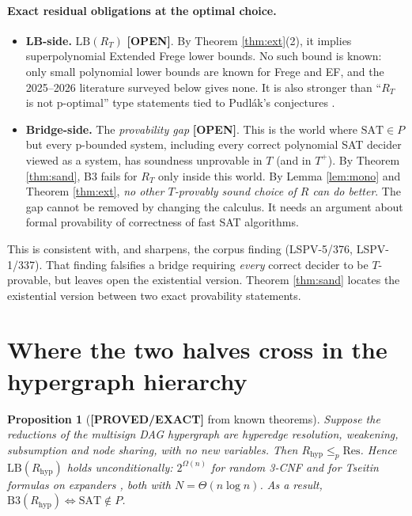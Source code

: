 \documentclass[11pt]{article}
\newtheorem{proposition}[theorem]{Proposition}
\theoremstyle{definition}
\theoremstyle{remark}
\newcommand{\SAT}{\mathrm{SAT}}
\newcommand{\status}[1]{\textbf{[#1]}}
\begin{document}
\paragraph{Exact residual obligations at the optimal choice.}
\begin{itemize}
\item \textbf{LB-side.} $\mathrm{LB}(R_T)$ \status{OPEN}. By Theorem \ref{thm:ext}(2), it implies
superpolynomial Extended Frege lower bounds. No such bound is known: only small polynomial
lower bounds are known for Frege and EF, and the 2025--2026 literature surveyed below gives
none. It is also stronger than ``$R_T$ is not p-optimal'' type statements tied to Pudlák's
conjectures \cite{Pud17}.
\item \textbf{Bridge-side.} The \emph{provability gap} \status{OPEN}. This is the world where
$\SAT\in P$ but every p-bounded system, including every correct polynomial SAT decider viewed as a
system, has soundness unprovable in $T$ (and in $T^{+}$). By Theorem \ref{thm:sand}, B3 fails for
$R_T$ only inside this world. By Lemma \ref{lem:mono} and Theorem \ref{thm:ext}, \emph{no other
$T$-provably sound choice of $R$ can do better}. The gap cannot be removed by changing the
calculus. It needs an argument about formal provability of correctness of fast SAT algorithms.
\end{itemize}

This is consistent with, and sharpens, the corpus finding (LSPV-5/376, LSPV-1/337). That finding
falsifies a bridge requiring \emph{every} correct decider to be $T$-provable, but leaves open the
existential version. Theorem \ref{thm:sand} locates the existential version between two exact
provability statements.

\section{Where the two halves cross in the hypergraph hierarchy}

\begin{proposition}[\status{PROVED/EXACT} from known theorems]\label{prop:cross}
Suppose the reductions of the multisign DAG hypergraph are hyperedge resolution, weakening,
subsumption and node sharing, with no new variables. Then $R_{\mathrm{hyp}}\le_p\mathrm{Res}$.
Hence $\mathrm{LB}(R_{\mathrm{hyp}})$ holds unconditionally: $2^{\Omega(n)}$ for random 3-CNF
\cite{CS88} and for Tseitin formulas on expanders \cite{Urq87}, both with $N=\Theta(n\log n)$. As a
result, $\mathrm{B3}(R_{\mathrm{hyp}})\Leftrightarrow\SAT\notin P$.
\end{proposition}
\end{document}
